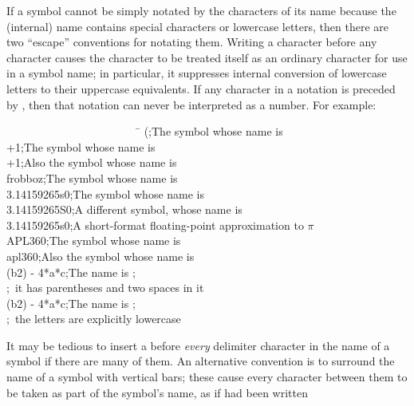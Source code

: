 {If a symbol cannot be simply notated by the characters of its name
because the (internal) name contains special characters or lowercase letters,
then there are two ``escape'' conventions for notating them.
Writing a \cd{{\Xbackslash}} character before any character causes the character
to be treated itself as an ordinary character for use in a symbol name;
in particular, it suppresses internal conversion of lowercase letters
to their uppercase equivalents.
If any character in a notation is preceded by \cd{{\Xbackslash}}, then that
notation can never be interpreted as a number.
For example:
\begin{lisp}
~~~~~~~~~~~~~~~~~~~~~~~~\=\kill
{\Xbackslash}(\>;{\rm The symbol whose name is \cd{(}} \\
{\Xbackslash}+1\>;{\rm The symbol whose name is } \\
+{\Xbackslash}1\>;{\rm Also the symbol whose name is } \\
{\Xbackslash}frobboz\>;{\rm The symbol whose name is } \\
3.14159265{\Xbackslash}s0\>;{\rm The symbol whose name is } \\
3.14159265{\Xbackslash}S0\>;{\rm A different symbol, whose name is } \\
3.14159265s0\>;{\rm A short-format floating-point approximation to \(\pi\)} \\
APL{\Xbackslash}{\Xbackslash}360\>;{\rm The symbol whose name is } \\
apl{\Xbackslash}{\Xbackslash}360\>;{\rm Also the symbol whose name is } \\
{\Xbackslash}(b{\Xcircumflex}2{\Xbackslash}){\Xbackslash} -{\Xbackslash} 4*a*c\>;{\rm The name is ;} \\
\>;~{\rm it has parentheses and two spaces in it} \\
{\Xbackslash}({\Xbackslash}b{\Xcircumflex}2{\Xbackslash}){\Xbackslash} -{\Xbackslash} 4*{\Xbackslash}a*{\Xbackslash}c\>;{\rm The name is ;} \\
\>;~{\rm the letters are explicitly lowercase}
\end{lisp}
It may be tedious to insert a \cd{{\Xbackslash}} before {\it every} delimiter
character in the name of a symbol if there are many of them.
An alternative convention is to surround the name of a symbol
with vertical bars; these cause every character between them to
be taken as part of the symbol's name, as if \cd{{\Xbackslash}} had been written
}
